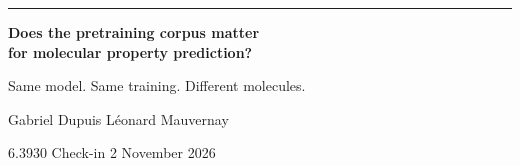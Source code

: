 \documentclass[aspectratio=169,10pt]{beamer}
\newcommand{\muted}[1]{\textcolor{ink2}{#1}}
\begin{document}
\begin{frame}[plain]
\vspace{16mm}
{\color{accent}\rule{18mm}{1.2mm}}\par\vspace{5mm}
{\fontsize{25}{31}\selectfont\bfseries Does the pretraining corpus matter\\
for molecular property prediction?\par}
\vspace{6mm}
{\Large\muted{Same model. Same training. Different molecules.}\par}
\vfill
{\large Gabriel Dupuis \qquad L\'eonard Mauvernay\par}
\vspace{1.5mm}
{\muted{6.3930 \;\textbullet\; Check-in 2 \;\textbullet{} November 2026}\par}
\vspace{9mm}
\end{frame}
\end{document}
